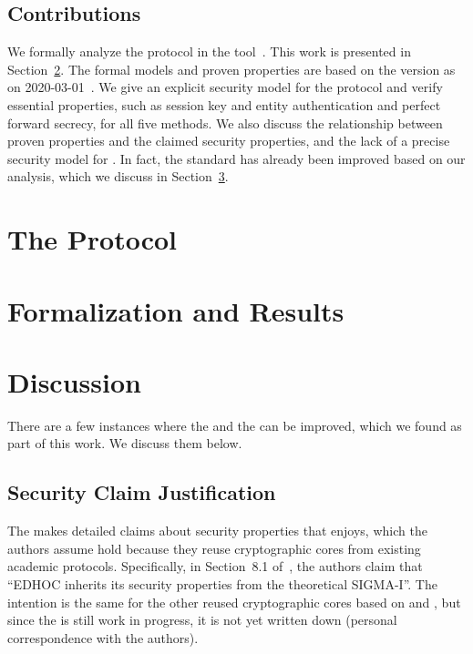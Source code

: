 \documentclass[runningheads, envcountsame, a4paper, draft, x11names]{llncs}
\begin{document}
\subsection{Contributions}
\label{sec:contributions}
We formally analyze the \mEdhoc{} protocol in the \mTamarin{}
tool~\cite{DBLP:conf/cav/MeierSCB13}.
%
This work is presented in Section~\ref{sec:formalization}.
%
The formal models and proven properties are based on the version as on
2020-03-01~\cite{selander-lake-edhoc-01}.
%
We give an explicit security model for the protocol and verify essential
properties, such as session key and entity authentication and perfect forward
secrecy, for all five methods.
%
We also discuss the relationship between proven properties and the claimed
security properties, and the lack of a precise security model for \mEdhoc{}.
%
In fact, the standard has already been improved based on our analysis,
which we discuss in Section~\ref{sec:discussion}.
%

\section{The \mEdhoc{} Protocol}
\label{sec:edhoc}


\section{Formalization and Results}
\label{sec:formalization}


\section{Discussion}
\label{sec:discussion}
There are a few instances where the \mEdhoc{} and the \mSpec{} can be improved,
which we found as part of this work. We discuss them below.
%

\subsection{Security Claim Justification}
\label{sec:securityClaims}
The \mSpec{} makes detailed claims about security properties that \mEdhoc{}
enjoys, which the authors assume hold because they reuse cryptographic cores
from existing academic protocols.
%
Specifically, in Section~8.1 of~\cite{selander-lake-edhoc-01}, the authors
claim that ``EDHOC inherits its security properties from the theoretical
SIGMA-I''.
%
The intention is the same for the other reused cryptographic
cores based on \mOptls{} and \mNoise{}, but since the \mSpec{} is still work in
progress, it is not yet written down (personal correspondence with the authors).
%
\end{document}
